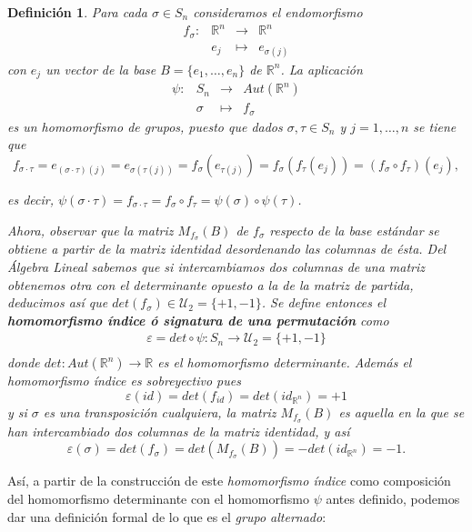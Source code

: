 \documentclass[12pt]{article}
\newtheorem{definition}[theorem]{Definición}
\begin{document}
\begin{definition}Para cada $\sigma \in S_{n}$ consideramos el endomorfismo $$\begin{array}{rccl}
f_{\sigma} \colon &\mathbb{R}^{n}& \longrightarrow &\mathbb{R}^{n}\\
&e_{j}& \longmapsto &e_{\sigma(j)}
\end{array}
$$ con $e_{j}$ un  vector de la base $B = \lbrace e_{1}, \ldots, e_{n} \rbrace$ de $\mathbb{R}^{n}$. La aplicación $$\begin{array}{rccl}
\psi \colon &S_{n}& \longrightarrow &Aut(\mathbb{R}^{n})\\
&\sigma& \longmapsto &f_{\sigma}
\end{array}
$$  es un homomorfismo de grupos, puesto que dados $\sigma, \tau \in S_{n}$ y $j = 1, \ldots, n$ se tiene que $$f_{\sigma \cdot \tau} = e_{(\sigma \cdot \tau)(j)}= e_{\sigma(\tau(j))} = f_{\sigma}(e_{\tau(j)}) = f_{\sigma}(f_{\tau}(e_{j})) = (f_{\sigma} \circ f_{\tau})(e_{j}),$$ 

es decir, $\psi(\sigma \cdot \tau) = f_{\sigma \cdot \tau} = f_{\sigma} \circ f_{\tau} = \psi(\sigma) \circ \psi(\tau)$.

Ahora, observar que la matriz $M_{f_{\sigma}}(B)$ de $f_{\sigma}$ respecto de la base estándar se obtiene a partir de la matriz identidad desordenando las columnas de ésta. Del \textit{Álgebra Lineal} sabemos que si intercambiamos dos columnas de una matriz obtenemos otra con el determinante opuesto a la de la matriz de partida, deducimos así que $det(f_{\sigma}) \in \mathcal{U}_{2} = \lbrace +1, -1 \rbrace$. Se define entonces el  \textbf{homomorfismo índice ó signatura de una permutación} como $$\begin{array}{rccl}
\varepsilon = det \circ \psi \colon S_{n} \longrightarrow \mathcal{U}_{2} = \lbrace +1, -1 \rbrace\\
\end{array}
$$ donde $det \colon Aut(\mathbb{R}^{n}) \longrightarrow \mathbb{R}$ es el homomorfismo determinante. Además el homomorfismo índice es sobreyectivo pues $$\varepsilon(id) = det(f_{id}) = det (id_{\mathbb{R}^{n}}) = +1$$ y si $\sigma$ es una transposición cualquiera, la matriz $M_{f_{\sigma}}(B)$ es aquella en la que se han intercambiado dos columnas de la matriz identidad, y así $$\varepsilon(\sigma) = det(f_{\sigma}) = det(M_{f_{\sigma}}(B)) = -det (id_{\mathbb{R}^{n}}) = -1.$$
\end{definition}

Así, a partir de la construcción de este \textit{homomorfismo índice} como composición del homomorfismo determinante con el homomorfismo $\psi$ antes definido, podemos dar una definición formal de lo que es el \textit{grupo alternado}:
\end{document}
